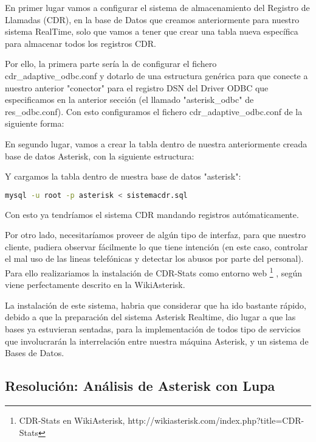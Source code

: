 En primer lugar vamos a configurar el sistema de almacenamiento del Registro de Llamadas (CDR), en la base de Datos que creamos anteriormente para nuestro sistema RealTime, solo que vamos a tener que crear una tabla nueva específica para almacenar todos los registros CDR.

Por ello, la primera parte sería la de configurar el fichero cdr\_adaptive\_odbc.conf y dotarlo de una estructura genérica para que conecte a nuestro anterior "conector" para el registro DSN del Driver ODBC que especificamos en la anterior sección (el llamado "asterisk\_odbc" de res\_odbc.conf). Con esto configuramos el fichero cdr\_adaptive\_odbc.conf de la siguiente forma:



En segundo lugar, vamos a crear la tabla dentro de nuestra anteriormente creada base de datos Asterisk, con la siguiente estructura:



Y cargamos la tabla dentro de nuestra base de datos "asterisk":

\begin{lstlisting}[language=sh]
mysql -u root -p asterisk < sistemacdr.sql
\end{lstlisting}

Con esto ya tendríamos el sistema CDR mandando registros autómaticamente.

Por otro lado, necesitaríamos proveer de algún tipo de interfaz, para que nuestro cliente, pudiera observar fácilmente lo que tiene intención (en este caso, controlar el mal uso de las lineas telefónicas y detectar los abusos por parte del personal). Para ello realizariamos la instalación de CDR-Stats como entorno web \footnote{CDR-Stats en WikiAsterisk, http://wikiasterisk.com/index.php?title=CDR-Stats} \cite{website:cdrstats}, según viene perfectamente descrito en la WikiAsterisk.

La instalación de este sistema, habria que considerar que ha ido bastante rápido, debido a que la preparación del sistema Asterisk Realtime, dio lugar a que las bases ya estuvieran sentadas, para la implementación de todos tipo de servicios que involucrarán la interrelación entre nuestra máquina Asterisk, y un sistema de Bases de Datos.

\subsection{Resolución: Análisis de Asterisk con Lupa}

